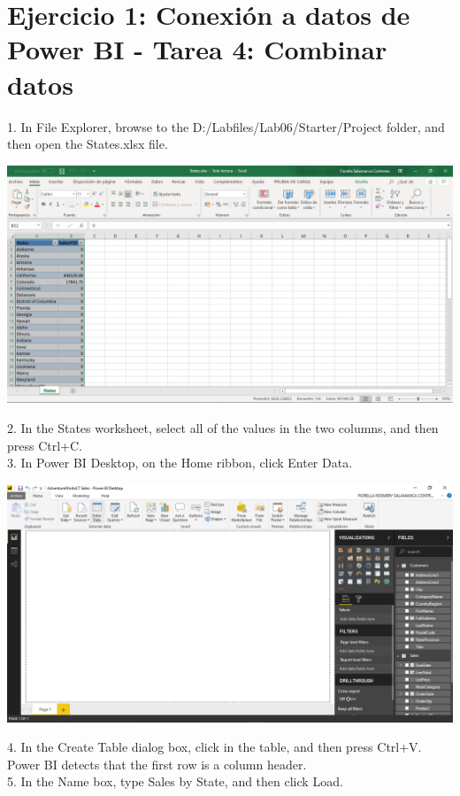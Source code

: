 \section{Ejercicio 1: Conexión a datos de Power BI - Tarea 4: Combinar datos} 

1. In File Explorer, browse to the D:/Labfiles/Lab06/Starter/Project folder, and then open the
States.xlsx file.\\

	\begin{center}
	\includegraphics[width=17cm]{./Imagenes/Ejercicio1/Tarea4/1}
	\end{center}	

2. In the States worksheet, select all of the values in the two columns, and then press Ctrl+C.\\
3. In Power BI Desktop, on the Home ribbon, click Enter Data.\\

	\begin{center}
	\includegraphics[width=17cm]{./Imagenes/Ejercicio1/Tarea4/2}
	\end{center}	

4. In the Create Table dialog box, click in the table, and then press Ctrl+V. Power BI detects that the first row is a column header.\\
5. In the Name box, type Sales by State, and then click Load.\\

